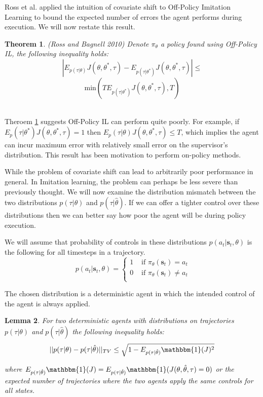 \documentclass[conference]{article}
\newcommand{\bs}{\mathbf{s}}
\newtheorem{theorem}{Theorem}[section]
\newtheorem{lemma}[theorem]{Lemma}
\begin{document}
Ross et al. applied the intuition of covariate shift to Off-Policy Imitation Learning to bound the expected number of errors the agent performs during execution. We will now restate this result. 

\begin{theorem}\label{thm:ross_error}
(Ross and Bagnell 2010) Denote $\pi_{\theta}$ a policy found using Off-Policy IL, the following inequality holds:
$$ |E_{p(\tau|\theta)} J(\theta,\theta^*,\tau) - E_{p(\tau|\theta^*)} J(\theta,\theta^*,\tau)| \leq$$
$$ \mbox{min}(TE_{p(\tau|\theta^*)} J(\theta,\theta^*,\tau),T)$$\\
\end{theorem}

Theroem \ref{thm:ross_error} suggests Off-Policy IL can perform quite poorly. For example, if $E_p(\tau|\theta^*) J(\theta,\theta^*,\tau) = 1$ then $E_p(\tau|\theta) J(\theta,\theta^*,\tau) \leq T$, which implies the agent can incur maximum error with relatively small error on the supervisor's distribution. 
This result has been motivation to perform on-policy methods\cite{ross2010reduction}. 

While the problem of covariate shift can lead to arbitrarily poor performance in general.  In Imitation learning, the problem can perhaps be less severe than previously thought. We will now examine the distribution mismatch between the two distributions $p(\tau|\theta)$ and $p(\tau|\hat{\theta})$. If we can offer a tighter control over these distributions then we can better say how poor the agent will be during policy execution. 

We will assume that probability of controls in these distributions $p(a_t|\bs_t,\theta)$ is the following for all timesteps in a trajectory. \\

\[
\ p(a_t|\bs_t,\theta) =
\left\{
\!
\begin{aligned}
1 & \text{ if } \pi_{\theta}(\bs_t) = a_t\\
0 & \text{ if } \pi_{\theta}(\bs_t) \neq a_t\\
\end{aligned}
\right.
\]

The chosen distribution is a deterministic agent in which the intended control of the agent is always applied. \\

\begin{lemma}\label{thm:dist_bound}
For two deterministic agents with distributions on trajectories $p(\tau|\theta)$ and $p(\tau|\hat{\theta})$ the following inequality holds:
$$||p(\tau|\theta) - p(\tau|\hat{\theta})||_{TV}  \leq \sqrt{1 - E_{p(\tau|\hat{\theta})} \mathbbm{1}(J)^2}$$


where $E_{p(\tau|\hat{\theta})} \mathbbm{1}(J) =  E_{p(\tau|\hat{\theta})} \mathbbm{1}(J(\theta,\hat{\theta},\tau) = 0)$ or the expected number of trajectories where the two agents apply the same controls for all states. \\
\end{lemma}
\end{document}
